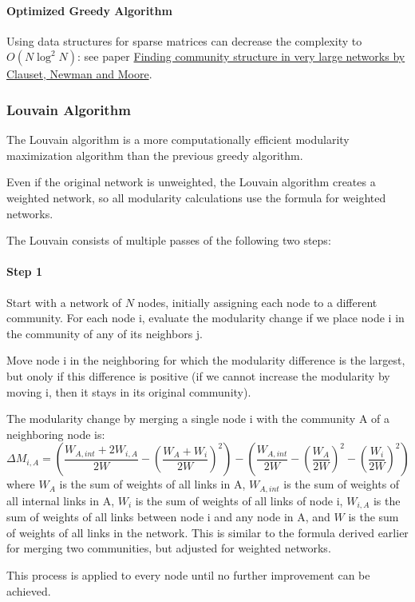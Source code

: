 \documentclass[11pt]{scrartcl} %
\begin{document}
\paragraph{Optimized Greedy Algorithm}
Using data structures for sparse matrices can decrease the complexity to $O(N \log^2 N)$: see paper \href{http://cs.unm.edu/~aaron/research/fastmodularity.htm}{Finding community structure in very large networks by Clauset, Newman and Moore}.

\subsubsection{Louvain Algorithm}
The Louvain algorithm is a more computationally efficient modularity maximization algorithm than the previous greedy algorithm.

Even if the original network is unweighted, the Louvain algorithm creates a weighted network, so all modularity calculations use the formula for weighted networks.

The Louvain consists of multiple passes of the following two steps:
\paragraph{Step 1} 
Start with a network of $N$ nodes, initially assigning each node to a different community. For each node i, evaluate the modularity change if we place node i in the community of any of its neighbors j.

Move node i in the neighboring for which the modularity difference is the largest, but onoly if this difference is positive (if we cannot increase the modularity by moving i, then it stays in its original community). 

The modularity change by merging a single node i with the community A of a neighboring node is:
\[ \Delta M_{i,A} = \left(\frac{W_{A,int} + 2 W_{i,A}}{2W} - \left( \frac{W_A + W_i}{2W} \right) ^2 \right) - \left( \frac{W_{A,int}}{2W} - \left( \frac{W_A}{2W} \right) ^2 - \left( \frac{W_i}{2W} \right) ^2 \right) \]
where $W_A$ is the sum of weights of all links in A, $W_{A,int}$ is the sum of weights of all internal links in A, $W_i$ is the sum of weights of all links of node i, $W_{i,A}$ is the sum of weights of all links between node i and any node in A, and $W$ is the sum of weights of all links in the network. This is similar to the formula derived earlier for merging two communities, but adjusted for weighted networks.

This process is applied to every node until no further improvement can be achieved.
\end{document}
